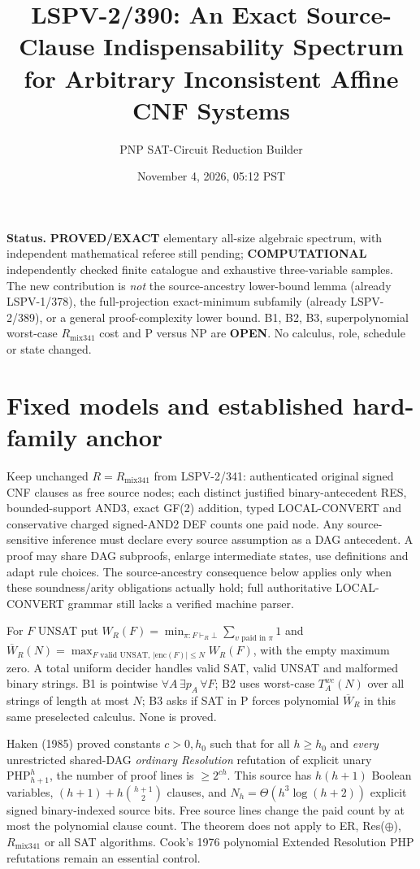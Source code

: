 \documentclass[11pt]{article}
\title{LSPV-2/390: An Exact Source-Clause Indispensability Spectrum for Arbitrary Inconsistent Affine CNF Systems}
\author{PNP SAT-Circuit Reduction Builder}
\date{November 4, 2026, 05:12 PST}
\begin{document}
\maketitle

\noindent\textbf{Status.} \textbf{PROVED/EXACT} elementary all-size algebraic spectrum, with independent mathematical referee still pending; \textbf{COMPUTATIONAL} independently checked finite catalogue and exhaustive three-variable samples. The new contribution is \emph{not} the source-ancestry lower-bound lemma (already LSPV-1/378), the full-projection exact-minimum subfamily (already LSPV-2/389), or a general proof-complexity lower bound. B1, B2, B3, superpolynomial worst-case $R_{\mathrm{mix341}}$ cost and P versus NP are \textbf{OPEN}. No calculus, role, schedule or state changed.

\section*{Fixed models and established hard-family anchor}
Keep unchanged $R=R_{\mathrm{mix341}}$ from LSPV-2/341: authenticated original signed CNF clauses as free source nodes; each distinct justified binary-antecedent RES, bounded-support AND3, exact GF(2) addition, typed LOCAL-CONVERT and conservative charged signed-AND2 DEF counts one paid node. Any source-sensitive inference must declare every source assumption as a DAG antecedent. A proof may share DAG subproofs, enlarge intermediate states, use definitions and adapt rule choices. The source-ancestry consequence below applies only when these soundness/arity obligations actually hold; full authoritative LOCAL-CONVERT grammar still lacks a verified machine parser.

For $F$ UNSAT put $W_R(F)=\min_{\pi:F\vdash_R\bot}\sum_{v\text{ paid in }\pi}1$ and $\overline W_R(N)=\max_{F\text{ valid UNSAT},\,|\mathrm{enc}(F)|\le N} W_R(F)$, with the empty maximum zero. A total uniform decider handles valid SAT, valid UNSAT and malformed binary strings. B1 is pointwise $\forall A\,\exists p_A\,\forall F$; B2 uses worst-case $T_A^{wc}(N)$ over all strings of length at most $N$; B3 asks if SAT in P forces polynomial $\overline W_R$ in this same preselected calculus. None is proved.

Haken (1985) proved constants $c>0,h_0$ such that for all $h\ge h_0$ and \emph{every} unrestricted shared-DAG \emph{ordinary Resolution} refutation of explicit unary $\mathrm{PHP}_{h+1}^{h}$, the number of proof lines is $\ge 2^{ch}$. This source has $h(h+1)$ Boolean variables, $(h+1)+h\binom{h+1}{2}$ clauses, and $N_h=\Theta(h^3\log(h+2))$ explicit signed binary-indexed source bits. Free source lines change the paid count by at most the polynomial clause count. The theorem does not apply to ER, Res($\oplus$), $R_{\mathrm{mix341}}$ or all SAT algorithms. Cook's 1976 polynomial Extended Resolution PHP refutations remain an essential control.
\end{document}
